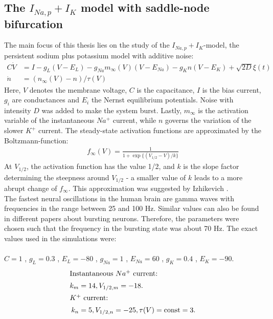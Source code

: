 \documentclass[12pt,a4paper]{article}
\begin{document}
\subsection{The $I_{Na,p}+I_K$ model with saddle-node bifurcation}
The main focus of this thesis lies on the study of the $I_{Na,p}+I_K$-model, the persistent sodium plus potassium model with additive noise:
\begin{align}\label{Veq}
C\dot{V} &= I - g_L(V-E_L) - g_{Na}m_{\infty}(V)(V-E_{Na}) - g_Kn(V-E_K)+\sqrt{2D}\xi(t)\\\label{neq}
\dot{n} &= (n_{\infty}(V)-n)/\tau(V)
\end{align}
Here, $V$ denotes the membrane voltage, $C$ is the capacitance, $I$ is the bias current, $g_i$ are conductances and $E_i$ the Nernst equilibrium potentials. Noise with intensity $D$ was added to make the system burst. Lastly, $m_{\infty}$ is the activation variable of the instantaneous $Na^+$ current, while $n$ governs the variation of the slower $K^+$ current. The steady-state activation functions are approximated by the Boltzmann-function:
\begin{align*}
f_{\infty}(V) = \frac{1}{1+\exp\{(V_{1/2}-V)/k\}}
\end{align*}
At $V_{1/2}$, the activation function has the value 1/2, and $k$ is the slope factor determining the steepness around $V_{1/2}$ - a smaller value of $k$ leads to a more abrupt change of $f_{\infty}$. This approximation was suggested by Izhikevich \cite{izi}.\\
The fastest neural oscillations in the human brain are gamma waves with frequencies in the range between 25 and 100 Hz\cite{gamma}\cite{gamma2}. Similar values can also be found in different papers about bursting neurons\cite{burstneu}\cite{burstneu2}. Therefore, the parameters were chosen such that the frequency in the bursting state was about 70 Hz.
The exact values used in the simulations were:\\\\
$C=1$ , $g_L=0.3$ , $E_L=-80$ , $g_{Na}=1$ , $E_{Na}=60$ , $g_K=0.4$ , $E_K=-90$.
\begin{align*}
\intertext{Instantaneous $Na^+$ current:} k_m&=14 , V_{1/2,m}=-18. 
\\
\intertext{$K^+$ current:} k_n&=5 , V_{1/2,n}=-25 , \tau(V)=\text{const}=3.
\end{align*}
\end{document}
